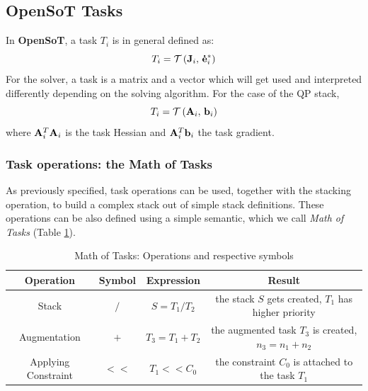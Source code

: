 \subsection{OpenSoT Tasks}
In \textbf{OpenSoT}, a task $T_i$ is in general defined as:
\begin{equation}
T_i = \mathcal{T} \left( \mathbf{J}_i,\, \mathbf{\dot{e}}^*_i \right)
\end{equation}
For the solver, a task is a matrix and a vector which will get used and interpreted differently depending on the solving algorithm. For the case of the QP stack,
\begin{equation}
T_i = \mathcal{T} \left( \mathbf{A}_i,\, \mathbf{b}_i \right)
\end{equation}
where $\mathbf{A}_i^T\mathbf{A}_i$ is the task Hessian and $\mathbf{A}_i^T\mathbf{b}_i$ the task gradient.

\subsubsection{Task operations: the Math of Tasks}
As previously specified, task operations can be used, together with the stacking operation, to build a complex stack out of simple stack definitions. These operations can be also defined using a simple semantic, which we call \emph{Math of Tasks} (Table \ref{table:mot}). 

\begin{table}[hbt]
   \begin{center}
   \begin{tabular}{| c | c | c | c |}
   \hline
   Operation & Symbol & Expression & Result \\\hline
   \cline{1-4}
   Stack                & $/$  & $S = T_1 / T_2$    & the stack $S$ gets created, $T_1$ has higher priority  \\\hline
   Augmentation         & $+$  & $T_3 = T_1 + T_2$  & the augmented task $T_3$ is created, $n_3 = n_1 + n_2$ \\\hline
   Applying Constraint  & $<<$ & $T_1 << C_0$       & the constraint $C_0$ is attached to the task $T_1$     \\\hline
   \end{tabular}
   \end{center}
   \caption{Math of Tasks: Operations and respective symbols}
   \label{table:mot}
\end{table}

